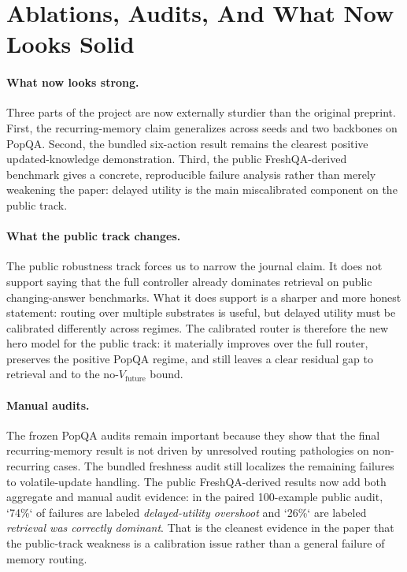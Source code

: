 \section{Ablations, Audits, And What Now Looks Solid}

\paragraph{What now looks strong.}
Three parts of the project are now externally sturdier than the original preprint. First, the recurring-memory claim generalizes across seeds and two backbones on PopQA. Second, the bundled six-action result remains the clearest positive updated-knowledge demonstration. Third, the public FreshQA-derived benchmark gives a concrete, reproducible failure analysis rather than merely weakening the paper: delayed utility is the main miscalibrated component on the public track.

\paragraph{What the public track changes.}
The public robustness track forces us to narrow the journal claim. It does not support saying that the full controller already dominates retrieval on public changing-answer benchmarks. What it does support is a sharper and more honest statement: routing over multiple substrates is useful, but delayed utility must be calibrated differently across regimes. The calibrated router is therefore the new hero model for the public track: it materially improves over the full router, preserves the positive PopQA regime, and still leaves a clear residual gap to retrieval and to the no-$V_{\text{future}}$ bound.

\paragraph{Manual audits.}
The frozen PopQA audits remain important because they show that the final recurring-memory result is not driven by unresolved routing pathologies on non-recurring cases. The bundled freshness audit still localizes the remaining failures to volatile-update handling. The public FreshQA-derived results now add both aggregate and manual audit evidence: in the paired 100-example public audit, `74\%` of failures are labeled \emph{delayed-utility overshoot} and `26\%` are labeled \emph{retrieval was correctly dominant}. That is the cleanest evidence in the paper that the public-track weakness is a calibration issue rather than a general failure of memory routing.
